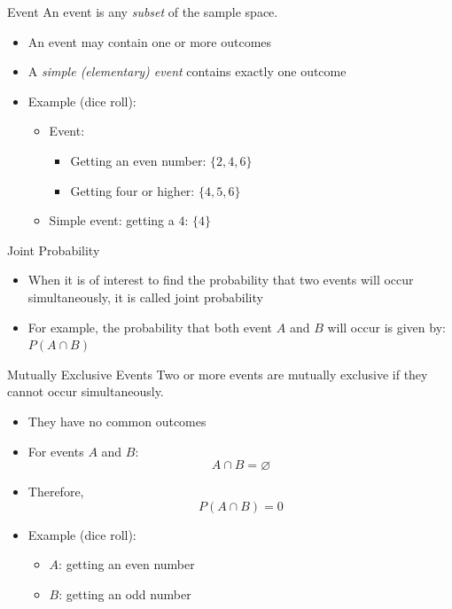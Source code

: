 \documentclass[12pt, aspectratio=169]{beamer}
\begin{document}
	\begin{frame}{Event}
		An event is any \emph{subset} of the sample space.
		\begin{itemize}
			\item An event may contain one or more outcomes
			\item A \emph{simple (elementary) event} contains exactly one outcome
			\item Example (dice roll):
			\begin{itemize}
				\item Event: 
				\begin{itemize}
					\item Getting an even number: $\{2,4,6\}$
					\item Getting four or higher: $\{4,5,6\}$
				\end{itemize}
				\item Simple event: getting a $4$: $\{4\}$
			\end{itemize}
		\end{itemize}
	\end{frame}


	\begin{frame}{Joint Probability}
		\begin{itemize}
			\item When it is of interest to find the probability that two events will occur simultaneously, it is called joint probability
			\item For example, the probability that both event $A$ and $B$ will occur is given by: $P(A \cap B)$
		\end{itemize}
	\end{frame}


	\begin{frame}{Mutually Exclusive Events}
		Two or more events are mutually exclusive if they cannot occur simultaneously.
		\begin{itemize}
			\item They have no common outcomes
			\item For events $A$ and $B$:
			\[
				A \cap B = \varnothing
			\]
			\item Therefore, $$P(A \cap B) = 0$$
			\item Example (dice roll):
			\begin{itemize}
				\item $A$: getting an even number
				\item $B$: getting an odd number
			\end{itemize}
		\end{itemize}
	\end{frame}
\end{document}
